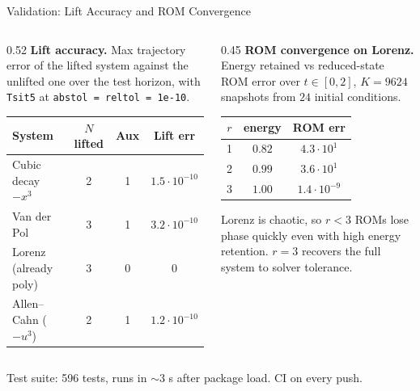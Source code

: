 \documentclass[aspectratio=169,10pt]{beamer}
\begin{document}
\begin{frame}{Validation: Lift Accuracy and ROM Convergence}
  \begin{columns}[T]
    \begin{column}{0.52\textwidth}
      \textbf{Lift accuracy.} Max trajectory error of the lifted system against the unlifted one over the test horizon, with \texttt{Tsit5} at \texttt{abstol = reltol = 1e-10}.

      \medskip
      \footnotesize
      \begin{tabular}{lccc}
        \toprule
        System                  & $N$ lifted & Aux & Lift err \\
        \midrule
        Cubic decay $-x^3$      & 2 & 1 & $1.5{\cdot}10^{-10}$ \\
        Van der Pol             & 3 & 1 & $3.2{\cdot}10^{-10}$ \\
        Lorenz (already poly)   & 3 & 0 & $0$ \\
        Allen--Cahn ($-u^3$)    & 2 & 1 & $1.2{\cdot}10^{-10}$ \\
        \bottomrule
      \end{tabular}
    \end{column}
    \begin{column}{0.45\textwidth}
      \textbf{ROM convergence on Lorenz.} Energy retained vs reduced-state ROM error over $t \in [0, 2]$, $K = 9624$ snapshots from $24$ initial conditions.

      \medskip
      \footnotesize
      \begin{tabular}{ccc}
        \toprule
        $r$ & energy & ROM err \\
        \midrule
        1 & $0.82$ & $4.3{\cdot}10^{1}$ \\
        2 & $0.99$ & $3.6{\cdot}10^{1}$ \\
        3 & $1.00$ & $1.4{\cdot}10^{-9}$ \\
        \bottomrule
      \end{tabular}

      \medskip
      \scriptsize Lorenz is chaotic, so $r < 3$ ROMs lose phase quickly even with high energy retention. $r = 3$ recovers the full system to solver tolerance.
    \end{column}
  \end{columns}

  \medskip
  Test suite: 596 tests, runs in $\sim$3 s after package load. CI on every push.
\end{frame}
\end{document}
